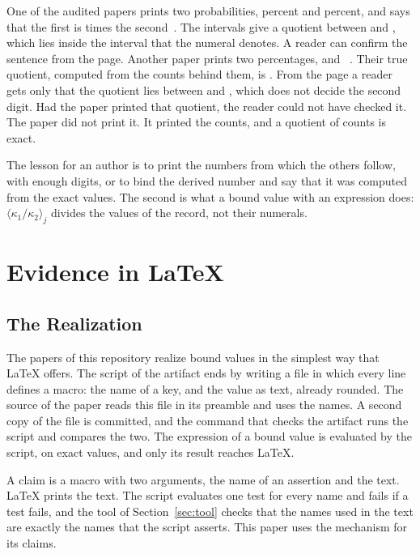 \documentclass[acmsmall,nonacm,screen]{acmart}
\newcommand{\bound}[2]{\langle #1 \rangle_{#2}}
\begin{document}
One of the audited papers prints two probabilities, \exEgP{} percent and \exEgPTwo{} percent,
and says that the first is \exEgRatio{} times the second~\citep{tpp9}. The intervals give a
quotient between \exEgLow{} and \exEgHigh{}, which lies inside the interval that the numeral
\exEgRatio{} denotes. A reader can confirm the sentence from the page. Another paper prints
two percentages, \exEgA{} and \exEgB{}~\citep{tpp4}. Their true quotient, computed from the
counts behind them, is \exEgQuot{}. From the page a reader gets only that the quotient lies
between \exEgQLow{} and \exEgQHigh{}, which does not decide the second digit. Had the paper
printed that quotient, the reader could not have checked it. The paper did not print it. It
printed the counts, and a quotient of counts is exact.

The lesson for an author is to print the numbers from which the others follow, with enough
digits, or to bind the derived number and say that it was computed from the exact values.
The second is what a bound value with an expression does: $\bound{\kappa_1 / \kappa_2}{j}$
divides the values of the record, not their numerals.

\section{Evidence in LaTeX}
\label{sec:latex}

\subsection{The Realization}

The papers of this repository realize bound values in the simplest way that LaTeX offers.
The script of the artifact ends by writing a file in which every line defines a macro: the
name of a key, and the value as text, already rounded. The source of the paper reads this
file in its preamble and uses the names. A second copy of the file is committed, and the
command that checks the artifact runs the script and compares the two. The expression of a
bound value is evaluated by the script, on exact values, and only its result reaches LaTeX.

A claim is a macro with two arguments, the name of an assertion and the text. LaTeX prints
the text. The script evaluates one test for every name and fails if a test fails, and the
tool of Section~\ref{sec:tool} checks that the names used in the text are exactly the names
that the script asserts. This paper uses the mechanism for its \exOwnClaims{} claims.
\end{document}
